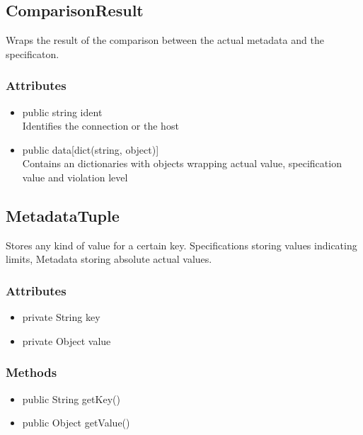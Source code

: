 \subsection{ComparisonResult}
Wraps the result of the comparison between the actual metadata and the specificaton.

\subsubsection{Attributes}
\begin{itemize}
	\item public  string ident\\
	Identifies the connection or the host
	\item public  data[dict(string, object)] \\
	Contains an dictionaries with objects wrapping actual value, specification value and violation level
\end{itemize}


\subsection{MetadataTuple}
Stores any kind of value for a certain key. Specifications storing values indicating limits, Metadata storing absolute actual values.

\subsubsection{Attributes}
\begin{itemize}
	\item private  String key
	\item private  Object value
\end{itemize}
\subsubsection{Methods}
\begin{itemize}
	\item public  String getKey()
	\item public  Object getValue()
\end{itemize}